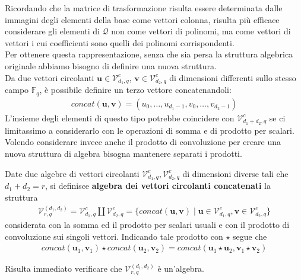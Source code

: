Ricordando che la matrice di trasformazione risulta essere determinata dalle immagini degli elementi della base come vettori colonna, risulta più efficace considerare gli elementi di $\mathcal{Q}$ non come vettori di polinomi, ma come vettori di vettori i cui coefficienti sono quelli dei polinomi corrispondenti. \\
Per ottenere questa rappresentazione, senza che sia persa la struttura algebrica originale abbiamo bisogno di definire una nuova struttura.\\
Da due vettori circolanti $\mathbf{u} \in \mathcal{V}_{d_{1}, q}^{c} $, $\mathbf{v} \in \mathcal{V}_{d_{2}, q}^{c} $ di dimensioni differenti sullo stesso campo $\mathbb{F}_{q}$, è possibile definire un terzo vettore concatenandoli:
\begin{align*}
   concat(\mathbf{u},\mathbf{v}) = (u_0,\dots,u_{d_{1} - 1}, v_0,\dots, v_{d_{2} - 1} ) 
\end{align*}
L'insieme degli elementi di questo tipo potrebbe coincidere con $\mathcal{V}_{d_{1}+d_{2}, q}^{c} $ se ci limitassimo a considerarlo con le operazioni di somma e di prodotto per scalari. Volendo considerare invece anche il prodotto di convoluzione per creare una nuova struttura di algebra bisogna mantenere separati i prodotti.
\begin{definizione}
   Date due algebre di vettori circolanti $\mathcal{V}_{d_{1}, q}^{c} , \mathcal{V}_{d_{2}, q}^{c} $ di dimensioni diverse tali che $d_{1} + d_{2} = r$, si definisce {\bf algebra dei vettori circolanti concatenati} la struttura 
   \begin{align*}
      \mathcal{V}_{r,q}^{(d_{1},d_{2})} = \mathcal{V}_{d_{1}, q}^{c} \coprod \mathcal{V}_{d_{2}, q}^{c}
      = \lbrace concat(\mathbf{u},\mathbf{v}) \mid \mathbf{u} \in \mathcal{V}_{d_{1}, q}^{c},  \mathbf{v} \in \mathcal{V}_{d_{2}, q}^{c} \rbrace
   \end{align*}
   considerata con la somma ed il prodotto per scalari usuali e con il prodotto di convoluzione sui singoli vettori. Indicando tale prodotto con $\star$ segue che
   \begin{align*}
      concat(\mathbf{u}_{1},\mathbf{v}_{1}) \star concat(\mathbf{u}_{2},\mathbf{v}_{2}) 
          = concat(\mathbf{u}_{1} \star \mathbf{u}_{2},\mathbf{v}_{1}\star \mathbf{v}_{2} ) 
   \end{align*}
\end{definizione}
\noindent
Risulta immediato verificare che $\mathcal{V}_{r,q}^{(d_{1},d_{2})}$ è un'algebra. \\
